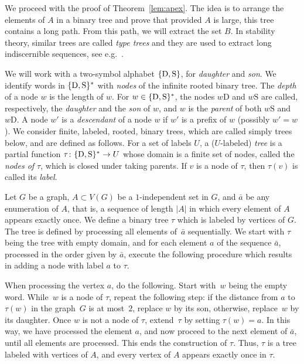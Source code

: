 We proceed with the proof of Theorem~\ref{lem:apex}.
The idea is to arrange the elements of $A$ in a binary tree
and prove that provided $A$ is large, this tree contains a long path. From this path, we will 
extract the set $B$. 
In stability theory, similar trees are called \emph{type trees} and they are used to extract long indiscernible sequences, see e.g.~\cite{malliaris2014regularity}. 


\newcommand{\dau}{\mathrm{D}}
\newcommand{\son}{\mathrm{S}}
	
	We will work with a two-symbol alphabet $\set{\dau,\son}$, for {\em{daughter}} and {\em{son}}.
	We identify words in $\set{\dau,\son}^*$ with \emph{nodes}
	of the infinite rooted binary tree. 
  The \emph{depth} of a node $w$ is the length of $w$.
  For $w\in \set{\dau,\son}^*$,
	 the nodes $w\dau$ and $w\son$ are called, respectively, the \emph{daughter} and the \emph{son} of $w$,
	and $w$ is the \emph{parent} of both $w\son$ and $w\dau$. A node $w'$ is a {\em{descendant}} of a node $w$ if $w'$ is a prefix of $w$ (possibly $w'=w$).
	We consider
	 finite, labeled, rooted, binary trees, which are called simply trees below, and are defined as follows.
	 For a set of labels $U$, a ($U$-labeled) \emph{tree} is a partial function $\tau\from \set{\dau,\son}^*\to U$ whose domain is a finite set of nodes, 
	 called the \emph{nodes of $\tau$}, which is closed under taking parents. 
	 If $v$ is a node of $\tau$, then $\tau(v)$ is called its \emph{label}.
  
  Let $G$ be a graph, $A\subset V(G)$ be a $1$-independent set in $G$,
  and $\bar a$ be any enumeration of $A$, that is, a sequence of length $|A|$ in which every element of $A$ appears exactly once.
  We define a binary tree $\tau$ which is 
  labeled by vertices of $G$. The tree is defined by processing all elements of~$\bar a$ sequentially. 
  We start with $\tau$ being the  tree with empty domain, and for each element $a$ of the sequence $\bar a$, processed in the order given by $\bar a$, 
  execute the following procedure which results in adding a node with label $a$ to $\tau$.
  
When processing the vertex $a$, do the following. Start with~$w$ being the empty word. While~$w$ is a node of $\tau$, repeat the following step: 
  if the distance from $a$ to $\tau(w)$ in the graph~$G$ is at most~$2$, replace $w$ by its son, otherwise, replace~$w$ by its daughter.
  Once $w$ is not a node of $\tau$, extend~$\tau$ by setting  $\tau(w)=a$. In this way, we have processed the element $a$, and now
    proceed to the next element of $\bar a$, until all elements are processed. This ends the construction of $\tau$.
    Thus, $\tau$ is a tree labeled with vertices of $A$, and every vertex of $A$ appears exactly once in $\tau$.
	

